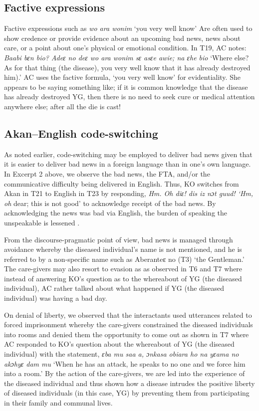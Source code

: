 \documentclass[output=paper,colorlinks,citecolor=brown]{langscibook}
\begin{document}
\subsection{Factive expressions}\label{sec:obeng:4.5}

Factive expressions such as \textit{wo ara wonim} ‘you very well know’ Are often used to show credence or provide evidence about an upcoming bad news, news about care, or a point about one’s physical or emotional condition. In T19, AC notes: \textit{Baabi bɛn bio? Adeɛ no deɛ wo ara wonim sɛ asɛe awie; na ɛhe bio} ‘Where else? As for that thing (the disease), you very well know that it has already destroyed him).’ AC uses the factive formula, ‘you very well know’ for evidentiality. She appears to be saying something like; if it is common knowledge that the disease has already destroyed YG, then there is no need to seek cure or medical attention anywhere else; after all the die is cast! 

\subsection{Akan--English code-switching}\label{sec:obeng:4.6}

As noted earlier, code-switching may be employed to deliver bad news given that it is easier to deliver bad news in a foreign language than in one’s own language. In Excerpt 2 above, we observe the bad news, the FTA, and/or the communicative difficulty being delivered in English. Thus, KO switches from Akan in T21 to English in T23 by responding, \textit{Hm. Oh diɛ! dis iz nɔt guud! ‘Hm, oh } dear; this is not good’ to acknowledge receipt of the bad news. By acknowledging the news was bad via English, the burden of speaking the unspeakable is lessened \citep{Movahedi1996}. 

From the discourse-pragmatic point of view, bad news is managed through avoidance whereby the diseased individual’s name is not mentioned, and he is referred to by a non-specific name such as Aberanteɛ no (T3) ‘the Gentleman.’ The care-givers may also resort to evasion as as observed in T6 and T7 where instead of answering KO’s question as to the whereabout of YG (the diseased individual), AC rather talked about what happened if YG (the diseased individual) was having a bad day.

On denial of liberty, we observed that the interactants used utterances related to forced imprisonment whereby the care-givers constrained the diseased individuals into rooms and denied them the opportunity to come out as shown in T7 where AC responded to KO’s question about the whereabout of YG (the diseased individual) with the statement, \textit{ɛba mu saa a, ɔnkasa obiara ho na yɛama no akɔhyɛ dam mu} ‘When he has an attack, he speaks to no one and we force him into a room.’ By the action of the care-givers, we are led into the experience of the diseased individual and thus shown how a disease intrudes the positive liberty of diseased individuals (in this case, YG) by preventing them from participating in their family and communal lives.
\end{document}
